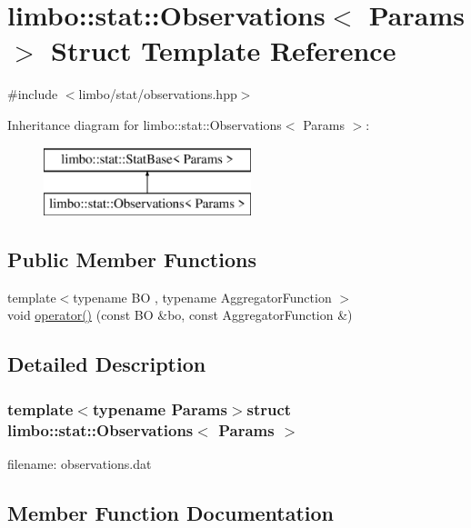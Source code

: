 \hypertarget{structlimbo_1_1stat_1_1_observations}{}\section{limbo\+:\+:stat\+:\+:Observations$<$ Params $>$ Struct Template Reference}
\label{structlimbo_1_1stat_1_1_observations}


{\ttfamily \#include $<$limbo/stat/observations.\+hpp$>$}

Inheritance diagram for limbo\+:\+:stat\+:\+:Observations$<$ Params $>$\+:\begin{figure}[H]
\begin{center}
\leavevmode
\includegraphics[height=2.000000cm]{structlimbo_1_1stat_1_1_observations}
\end{center}
\end{figure}
\subsection*{Public Member Functions}
\begin{DoxyCompactItemize}
\item 
{\footnotesize template$<$typename B\+O , typename Aggregator\+Function $>$ }\\void \hyperlink{structlimbo_1_1stat_1_1_observations_ad39d50d8d1b6e7e699bb2bc6c775d391}{operator()} (const B\+O \&bo, const Aggregator\+Function \&)
\end{DoxyCompactItemize}


\subsection{Detailed Description}
\subsubsection*{template$<$typename Params$>$struct limbo\+::stat\+::\+Observations$<$ Params $>$}

filename\+: {\ttfamily observations.\+dat} 

\subsection{Member Function Documentation}
\hypertarget{structlimbo_1_1stat_1_1_observations_ad39d50d8d1b6e7e699bb2bc6c775d391}{}
